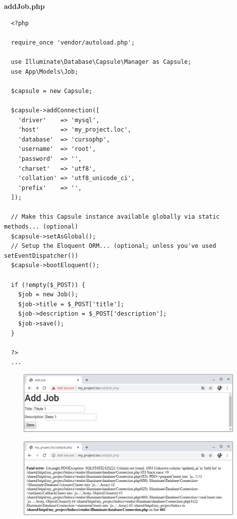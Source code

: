 \documentclass{article}
\begin{document}
\textbf{addJob.php}
\begin{verbatim}
  <?php

  require_once 'vendor/autoload.php';

  use Illuminate\Database\Capsule\Manager as Capsule;
  use App\Models\Job;

  $capsule = new Capsule;

  $capsule->addConnection([
    'driver'    => 'mysql',
    'host'      => 'my_project.loc',
    'database'  => 'cursophp',
    'username'  => 'root',
    'password'  => '',
    'charset'   => 'utf8',
    'collation' => 'utf8_unicode_ci',
    'prefix'    => '',
  ]);

  // Make this Capsule instance available globally via static methods... (optional)
  $capsule->setAsGlobal();
  // Setup the Eloquent ORM... (optional; unless you've used setEventDispatcher())
  $capsule->bootEloquent();

  if (!empty($_POST)) {
    $job = new Job();
    $job->title = $_POST['title'];
    $job->description = $_POST['description'];
    $job->save();
  }

  ?>
  ...
\end{verbatim}

\newpage

\begin{figure}[h!]
  \centering
  \includegraphics[scale=0.5]{./Pictures/077_eloquent_ok.png}
\end{figure}

\begin{figure}[h!]
  \centering
  \includegraphics[scale=0.5]{./Pictures/078_eloquent_columna_error.png}
\end{figure}
\end{document}
